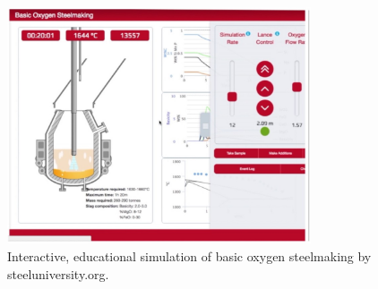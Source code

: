 \begin{figure}[!ht]
	\label{fig:steeluniversity}
	\centering
	\includegraphics[width=0.8\textwidth]{figures/steeluniversity.jpg}
	\caption{Interactive, educational simulation of basic oxygen steelmaking by steeluniversity.org.}
\end{figure}




